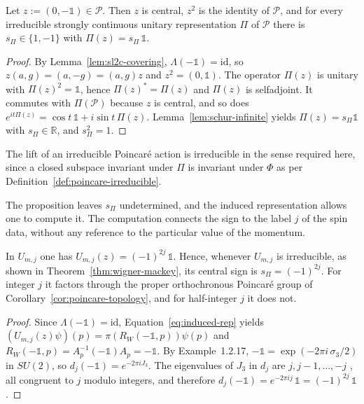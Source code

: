 \begin{proposition}\label{prop:central-sign}
	Let $z:=(0,-\mathbb{1})\in\mathcal{P}$. Then $z$ is central, $z^2$ is the identity of $\mathcal{P}$, and for every irreducible strongly continuous unitary representation $\Pi$ of $\mathcal{P}$ there is $s_\Pi\in\{1,-1\}$ with $\Pi(z)=s_\Pi\,\mathbb{1}$.
\end{proposition}

\begin{proof}
	By Lemma~\ref{lem:sl2c-covering}, $\Lambda(-\mathbb{1})=\mathrm{id}$, so $z(a,g)=(a,-g)=(a,g)z$ and $z^2=(0,\mathbb{1})$. The operator $\Pi(z)$ is unitary with $\Pi(z)^2=\mathbb{1}$, hence $\Pi(z)^*=\Pi(z)$ and $\Pi(z)$ is selfadjoint. It commutes with $\Pi(\mathcal{P})$ because $z$ is central, and so does $e^{it\Pi(z)}=\cos t\,\mathbb{1}+i\sin t\,\Pi(z)$. Lemma~\ref{lem:schur-infinite} yields $\Pi(z)=s_\Pi\mathbb{1}$ with $s_\Pi\in\mathbb{R}$, and $s_\Pi^2=1$.
\end{proof}

\noindent The lift of an irreducible Poincar\'e action is irreducible in the sense required here, since a closed subspace invariant under $\Pi$ is invariant under $\Phi$ as per Definition~\ref{def:poincare-irreducible}.

The proposition leaves $s_\Pi$ undetermined, and the induced representation allows one to compute it. The computation connects the sign to the label $j$ of the spin data, without any reference to the particular value of the momentum.

\begin{corollary}\label{cor:central-sign-spin}
	In $U_{m,j}$ one has $U_{m,j}(z)=(-1)^{2j}\,\mathbb{1}$. Hence, whenever $U_{m,j}$ is irreducible, as shown in Theorem~\ref{thm:wigner-mackey}, its central sign is $s_\Pi=(-1)^{2j}$. For integer $j$ it factors through the proper orthochronous Poincar\'e group of Corollary~\ref{cor:poincare-topology}, and for half-integer $j$ it does not.
\end{corollary}

\begin{proof}
	Since $\Lambda(-\mathbb{1})=\mathrm{id}$, Equation~\eqref{eq:induced-rep} yields $(U_{m,j}(z)\psi)(p)=\pi(R_W(-\mathbb{1},p))\psi(p)$ and $R_W(-\mathbb{1},p)=A_p^{-1}(-\mathbb{1})A_p=-\mathbb{1}$. By Example~1.2.17, $-\mathbb{1}=\exp(-2\pi i\,\sigma_3/2)$ in $SU(2)$, so $d_j(-\mathbb{1})=e^{-2\pi iJ_3}$. The eigenvalues of $J_3$ in $d_j$ are $j,j-1,\dots,-j$ \cite[TODO-location]{TODO-Hal03}, all congruent to $j$ modulo integers, and therefore $d_j(-\mathbb{1})=e^{-2\pi ij}\,\mathbb{1}=(-1)^{2j}\,\mathbb{1}$.
\end{proof}

